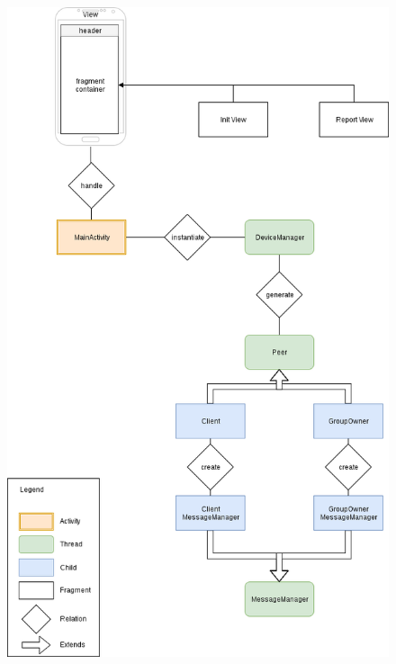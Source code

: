 \documentclass{llncs}
\begin{document}
\begin{figure}[H]
	\includegraphics[scale=0.3,center]{img/class.png}
	\caption{}
	\label{fig:class}
\end{figure}
\noindent
\end{document}
